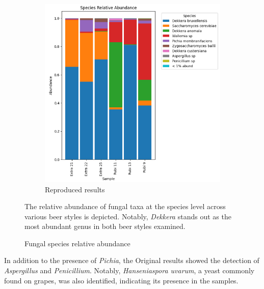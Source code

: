 \begin{figure}[H]
\begin{subfigure}[b]{0.45\textwidth}
        \includegraphics[width=\textwidth]{images/doppelbock_relative_abundence.png}
        \caption{Reproduced results}
    \end{subfigure}
    \caption{Fungal species relative abundance}
    \small The relative abundance of fungal taxa at the species level across various beer styles is depicted. Notably, \textit{Dekkera} stands out as the most abundant genus in both beer styles examined.
    \label{fig:methods:doppelbock_relative_abundence_fungal}
\end{figure}

    In addition to the presence of \textit{Pichia}, the Original results showed the detection of \textit{Aspergillus} and \textit{Penicillium}. Notably, \textit{Hanseniaspora uvarum}, a yeast commonly found on grapes\cite{fleet1993wine}, was also identified, indicating its presence in the samples.

